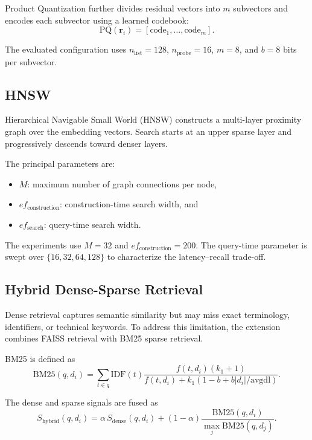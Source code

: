 \documentclass[conference]{IEEEtran}
\begin{document}
Product Quantization further divides residual vectors into $m$ subvectors and encodes each subvector using a learned codebook:
\begin{equation}
\mathrm{PQ}(\mathbf{r}_i)
=[\mathrm{code}_1,\ldots,\mathrm{code}_m].
\end{equation}

The evaluated configuration uses $n_{\mathrm{list}}=128$, $n_{\mathrm{probe}}=16$, $m=8$, and $b=8$ bits per subvector.

\subsection{HNSW}

Hierarchical Navigable Small World (HNSW) constructs a multi-layer proximity graph over the embedding vectors. Search starts at an upper sparse layer and progressively descends toward denser layers.

The principal parameters are:
\begin{itemize}
    \item $M$: maximum number of graph connections per node,
    \item $ef_{\mathrm{construction}}$: construction-time search width, and
    \item $ef_{\mathrm{search}}$: query-time search width.
\end{itemize}

The experiments use $M=32$ and $ef_{\mathrm{construction}}=200$. The query-time parameter is swept over $\{16,32,64,128\}$ to characterize the latency--recall trade-off.

\subsection{Hybrid Dense-Sparse Retrieval}

Dense retrieval captures semantic similarity but may miss exact terminology, identifiers, or technical keywords. To address this limitation, the extension combines FAISS retrieval with BM25 sparse retrieval.

BM25 is defined as
\begin{equation}
\mathrm{BM25}(q,d_i)=
\sum_{t\in q}\mathrm{IDF}(t)
\frac{f(t,d_i)(k_1+1)}
{f(t,d_i)+k_1(1-b+b|d_i|/\mathrm{avgdl})}.
\end{equation}

The dense and sparse signals are fused as
\begin{equation}
S_{\mathrm{hybrid}}(q,d_i)=
\alpha\,S_{\mathrm{dense}}(q,d_i)
+(1-\alpha)
\frac{\mathrm{BM25}(q,d_i)}
{\max_j\mathrm{BM25}(q,d_j)}.
\end{equation}
\end{document}
